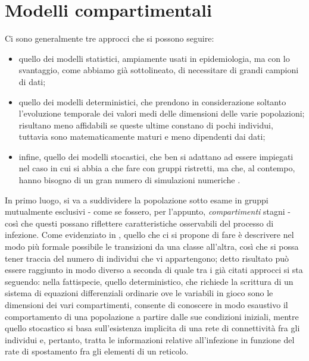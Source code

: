 \section{Modelli compartimentali}
Ci sono generalmente tre approcci che si possono seguire:
\begin{itemize}
\item quello dei modelli statistici, ampiamente usati in epidemiologia, ma con lo svantaggio, come abbiamo già sottolineato, di necessitare di grandi campioni di dati;
\item quello dei modelli deterministici, 
che prendono in considerazione soltanto l'evoluzione temporale dei valori medi delle dimensioni delle varie popolazioni; risultano meno affidabili se queste ultime constano di pochi individui, tuttavia sono matematicamente maturi e meno dipendenti dai dati;
\item infine, quello dei modelli stocastici, che ben si adattano ad essere impiegati nel caso in cui si abbia a che fare con gruppi ristretti, ma che, al contempo, hanno bisogno di un gran numero di simulazioni numeriche \cite{Li}.  
\end{itemize}
In primo luogo, si va a suddividere la popolazione sotto esame in gruppi mutualmente esclusivi - come se fossero, per l'appunto, \emph{compartimenti} stagni - così che questi possano riflettere caratteristiche osservabili del processo di infezione. Come evidenziato in \cite{Kiss}, quello che ci si propone di fare è descrivere nel modo più formale possibile le transizioni da una classe all'altra, così che si possa tener traccia del numero di individui che vi appartengono; detto risultato può essere raggiunto in modo diverso a seconda di quale tra i già citati approcci si sta seguendo: 
nella fattispecie, quello deterministico, che richiede la scrittura di un sistema di equazioni differenziali ordinarie ove le variabili in gioco sono le dimensioni dei vari compartimenti, consente di conoscere in modo esaustivo il comportamento di una popolazione a partire dalle sue condizioni iniziali, mentre quello stocastico si basa sull'esistenza implicita di una rete di connettività fra gli individui e, pertanto, tratta le informazioni relative all'infezione in funzione del rate di spostamento fra gli elementi di un reticolo.

